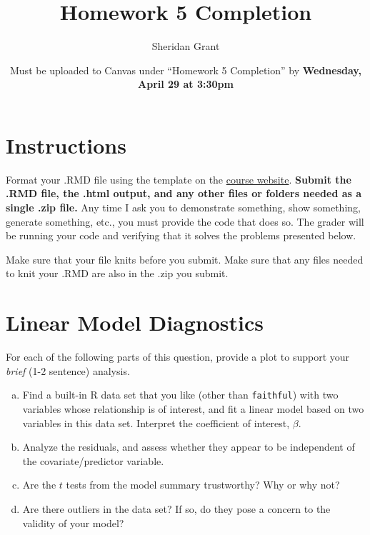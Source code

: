 \documentclass[12pt]{article}
\title{Homework 5 Completion}
\author{Sheridan Grant}
\date{Must be uploaded to Canvas under ``Homework 5 Completion'' by \textbf{Wednesday, April 29 at 3:30pm}}
\begin{document}
\sloppy

\maketitle

\section*{Instructions}

Format your .RMD file using the template on the \href{https://sheridanlgrant.github.io/teaching/STAT302_SPR2020}{course website}. \textbf{Submit the .RMD file, the .html output, and any other files or folders needed as a single .zip file.} Any time I ask you to demonstrate something, show something, generate something, etc., you must provide the code that does so. The grader will be running your code and verifying that it solves the problems presented below.

Make sure that your file knits before you submit. Make sure that any files needed to knit your .RMD are also in the .zip you submit.

\section{Linear Model Diagnostics}

For each of the following parts of this question, provide a plot to support your \textit{brief} (1-2 sentence) analysis.

\begin{enumerate}[(a)]
	\item Find a built-in R data set that you like (other than \verb|faithful|) with two variables whose relationship is of interest, and fit a linear model based on two variables in this data set. Interpret the coefficient of interest, $\beta$.
	\item Analyze the residuals, and assess whether they appear to be independent of the covariate/predictor variable.
	\item Are the $t$ tests from the model summary trustworthy? Why or why not?
	\item Are there outliers in the data set? If so, do they pose a concern to the validity of your model?
\end{enumerate}
\end{document}
